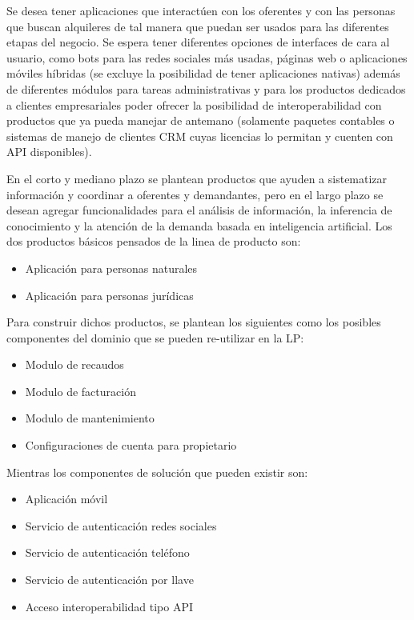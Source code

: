 \documentclass[letterpaper]{article}
\begin{document}
Se desea tener aplicaciones que interactúen con los oferentes y con las personas que buscan alquileres de tal manera que puedan ser usados para las diferentes etapas del negocio. Se espera tener diferentes opciones de interfaces de cara al usuario, como bots para las redes sociales más usadas, páginas web o aplicaciones móviles híbridas (se excluye la posibilidad de tener aplicaciones nativas) además de diferentes módulos para tareas administrativas y para los productos dedicados a clientes empresariales poder ofrecer la posibilidad de interoperabilidad con productos que ya pueda manejar de antemano (solamente paquetes contables o sistemas de manejo de clientes CRM cuyas licencias lo permitan y cuenten con API disponibles).

En el corto y mediano plazo se plantean productos que ayuden a sistematizar información y coordinar a oferentes y demandantes, pero en el largo plazo se desean agregar funcionalidades para el análisis de información, la inferencia de conocimiento y la atención de la demanda basada en inteligencia artificial. Los dos productos básicos pensados de la linea de producto son:

\begin{itemize}
    \item Aplicación para personas naturales
    \item Aplicación para personas jurídicas
\end{itemize}

Para construir dichos productos, se plantean los siguientes como los posibles componentes del dominio que se pueden re-utilizar en la LP:

\begin{itemize}
    \item Modulo de recaudos
    \item Modulo de facturación
    \item Modulo de mantenimiento
    \item Configuraciones de cuenta para propietario
\end{itemize}

Mientras los componentes de solución que pueden existir son:

\begin{itemize}
    \item Aplicación móvil
    \item Servicio de autenticación redes sociales
    \item Servicio de autenticación teléfono
    \item Servicio de autenticación por llave
    \item Acceso interoperabilidad tipo API
\end{itemize}
\end{document}
